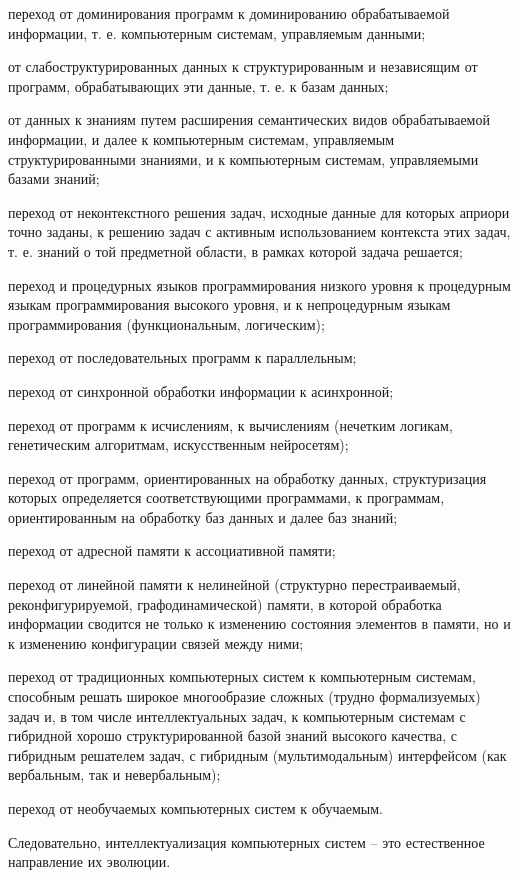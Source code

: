 \begin{SCn}
{\begin{scnitemize}
    \item переход от доминирования программ к доминированию обрабатываемой информации, т. е. компьютерным системам, управляемым данными;
    \item от слабоструктурированных данных к структурированным и независящим от программ, обрабатывающих эти данные, т. е. к базам данных;
    \item от данных к знаниям путем расширения семантических видов обрабатываемой информации, и далее к компьютерным системам, управляемым структурированными знаниями, и к компьютерным системам, управляемыми базами знаний;
    \item переход от неконтекстного решения задач, исходные данные для которых априори точно заданы, к решению задач с активным использованием контекста этих задач, т. е. знаний о той предметной области, в рамках которой задача решается;
    \item переход и процедурных языков программирования низкого уровня к процедурным языкам программирования высокого уровня, и к непроцедурным языкам программирования (функциональным, логическим);
    \item переход от последовательных программ к параллельным;
    \item переход от синхронной обработки информации к асинхронной;
    \item переход от программ к исчислениям, к  вычислениям (нечетким логикам, генетическим алгоритмам, искусственным нейросетям);
    \item переход от программ, ориентированных на обработку данных, структуризация которых определяется соответствующими программами, к программам, ориентированным на обработку баз данных и далее баз знаний;
    \item переход от адресной памяти к ассоциативной памяти;
    \item переход от линейной памяти к нелинейной (структурно перестраиваемый, реконфигурируемой, графодинамической) памяти, в которой обработка информации сводится не только к изменению состояния элементов в памяти, но и к изменению конфигурации связей между ними;
    \item переход от традиционных компьютерных систем к компьютерным системам, способным решать широкое многообразие сложных (трудно формализуемых) задач и, в том числе интеллектуальных задач, к компьютерным системам с гибридной хорошо структурированной базой знаний высокого качества, с гибридным решателем задач, с гибридным (мультимодальным) интерфейсом (как вербальным, так и невербальным);
    \item переход от необучаемых компьютерных систем к обучаемым.
\end{scnitemize}

Следовательно, интеллектуализация компьютерных систем -- это естественное направление их эволюции.}

\scnendstruct

\end{SCn}